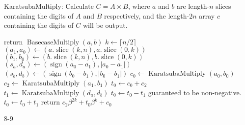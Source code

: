 \documentclass{computer-arithmetic}
\begin{document}
\begin{algorithm}
  \caption{KaratsubaMultiply: Calculate \(C = A × B\), where \(a\) and
    \(b\) are length-\(n\) slices containing the digits of \(A\) and
    \(B\) respectively, and the length-\(2n\) array \(c\) containing
    the digits of \(C\) will be output.}
\begin{algorithmic}[1]
    \State return $\operatorname{BasecaseMultiply}(a, b)$
\EndIf
\State $k ← \lceil n / 2 \rceil$
\State \((a_1, a_0) ← (a.\operatorname{slice}(k, n), a.\operatorname{slice}(0, k))\)
\State \((b_1, b_0) ← (b.\operatorname{slice}(k, n), b.\operatorname{slice}(0, k))\)
\State \((s_a, d_a) ← (\operatorname{sign}(a_0 - a_1), \lvert a_0 - a_1 \rvert)\)
\State \((s_b, d_b) ← (\operatorname{sign}(b_0 - b_1), \lvert b_0 - b_1 \rvert)\)
\State \(c_0 ← \operatorname{KaratsubaMultiply}(a_0, b_0)\)
\State \(c_2 ← \operatorname{KaratsubaMultiply}(a_1, b_1)\)
\State \(t_0 ← c_0 + c_2\)
\State \(t_1 ← \operatorname{KaratsubaMultiply}(d_a, d_b)\)
\State \(t_0 ← t_0 - t_1\)
\Comment guaranteed to be non-negative.
\Else
\State \(t_0 ← t_0 + t_1\)
\EndIf
\State return \(c_2 β^{2k} + t_0 β^k + c_0\)
\end{algorithmic}
\end{algorithm}

\begin{problem}{8-9}
\end{problem}

\begin{solution}
\end{solution}
\end{document}
